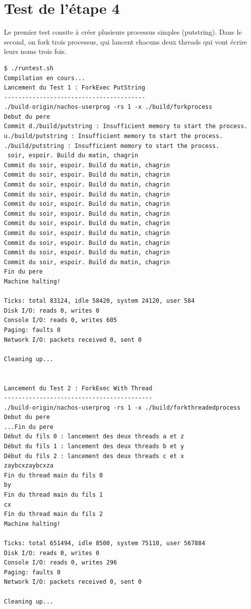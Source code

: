 \documentclass[a4paper,10pt]{article}
\begin{document}
\section{Test de l'étape 4}

Le premier test consite à créer plusieurs processus simples (putstring).
Dans le second, on fork trois processus, qui lancent chacuns deux threads
qui vont écrire leurs noms trois fois.

\begin{lstlisting}
$ ./runtest.sh
Compilation en cours...
Lancement du Test 1 : ForkExec PutString
----------------------------------------
./build-origin/nachos-userprog -rs 1 -x ./build/forkprocess
Debut du pere
Commit d./build/putstring : Insufficient memory to start the process.
u./build/putstring : Insufficient memory to start the process.
./build/putstring : Insufficient memory to start the process.
 soir, espoir. Build du matin, chagrin
Commit du soir, espoir. Build du matin, chagrin
Commit du soir, espoir. Build du matin, chagrin
Commit du soir, espoir. Build du matin, chagrin
Commit du soir, espoir. Build du matin, chagrin
Commit du soir, espoir. Build du matin, chagrin
Commit du soir, espoir. Build du matin, chagrin
Commit du soir, espoir. Build du matin, chagrin
Commit du soir, espoir. Build du matin, chagrin
Commit du soir, espoir. Build du matin, chagrin
Commit du soir, espoir. Build du matin, chagrin
Commit du soir, espoir. Build du matin, chagrin
Fin du pere
Machine halting!

Ticks: total 83124, idle 58420, system 24120, user 584
Disk I/O: reads 0, writes 0
Console I/O: reads 0, writes 605
Paging: faults 0
Network I/O: packets received 0, sent 0

Cleaning up...


Lancement du Test 2 : ForkExec With Thread
------------------------------------------
./build-origin/nachos-userprog -rs 1 -x ./build/forkthreadedprocess
Debut du pere
...Fin du pere
Début du fils 0 : lancement des deux threads a et z
Début du fils 1 : lancement des deux threads b et y
Début du fils 2 : lancement des deux threads c et x
zaybcxzaybcxza
Fin du thread main du fils 0
by
Fin du thread main du fils 1
cx
Fin du thread main du fils 2
Machine halting!

Ticks: total 651494, idle 8500, system 75110, user 567884
Disk I/O: reads 0, writes 0
Console I/O: reads 0, writes 296
Paging: faults 0
Network I/O: packets received 0, sent 0

Cleaning up...
\end{lstlisting}
\end{document}
